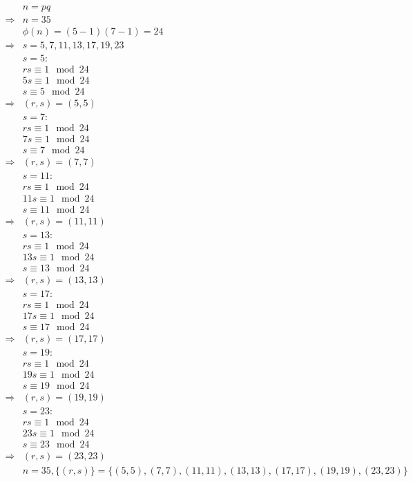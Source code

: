 \documentclass{article}
\begin{document}
\begin{align*}
    &n=pq\\
    \Rightarrow&n=35\\
    &\phi(n)=(5-1)(7-1)=24\\
    \Rightarrow&s=5,7,11,13,17,19,23\\
    &s=5:\\
    &rs\equiv 1\mod 24\\
    &5s\equiv 1\mod 24\\
    &s\equiv 5\mod 24\\
    \Rightarrow&(r,s)=(5,5)\\
    &s=7:\\
    &rs\equiv 1\mod 24\\
    &7s\equiv 1\mod 24\\
    &s\equiv 7\mod 24\\
    \Rightarrow&(r,s)=(7,7)\\
    &s=11:\\
    &rs\equiv 1\mod 24\\
    &11s\equiv 1\mod 24\\
    &s\equiv 11\mod 24\\
    \Rightarrow&(r,s)=(11,11)\\
    &s=13:\\
    &rs\equiv 1\mod 24\\
    &13s\equiv 1\mod 24\\
    &s\equiv 13\mod 24\\
    \Rightarrow&(r,s)=(13,13)\\
    &s=17:\\
    &rs\equiv 1\mod 24\\
    &17s\equiv 1\mod 24\\
    &s\equiv 17\mod 24\\
    \Rightarrow&(r,s)=(17,17)\\
    &s=19:\\
    &rs\equiv 1\mod 24\\
    &19s\equiv 1\mod 24\\
    &s\equiv 19\mod 24\\
    \Rightarrow&(r,s)=(19,19)\\
    &s=23:\\
    &rs\equiv 1\mod 24\\
    &23s\equiv 1\mod 24\\
    &s\equiv 23\mod 24\\
    \Rightarrow&(r,s)=(23,23)\\
    &n=35,\{(r,s)\}=\{(5,5),(7,7),(11,11),(13,13),(17,17),(19,19),(23,23)\}\\
\end{align*}
\end{document}
